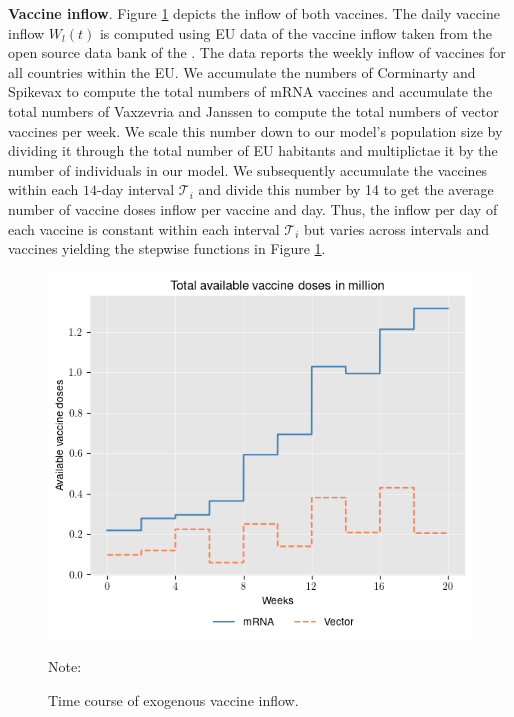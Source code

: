 \textbf{Vaccine inflow}. Figure \ref{fig:available_vaccine} depicts the inflow of both vaccines. The daily vaccine inflow $W_l(t)$ is computed using EU data of the vaccine inflow taken from the open source data bank of the \cite{ECDC.2021}. The data reports the weekly inflow of vaccines for all countries within the EU. We accumulate the numbers of Corminarty and Spikevax to compute the total numbers of mRNA vaccines and accumulate the total numbers of Vaxzevria and Janssen to compute the total numbers of vector vaccines per week. We scale this number down to our model's population size by dividing it through the total number of EU habitants and multiplictae it by the number of individuals in our model. We subsequently accumulate the vaccines within each $14$-day interval $\mathcal{T}_i$ and divide this number by 14 to get the average number of vaccine doses inflow per vaccine and day. Thus, the inflow per day of each vaccine is constant within each interval $\mathcal{T}_i$ but varies across intervals and vaccines yielding the stepwise functions in Figure \ref{fig:available_vaccine}. 
\begin{figure}[h!]
\centering
\includegraphics[scale=0.7]{images/available_vaccine.png}\\
\begin{flushleft}
\scriptsize{Note: } 
\end{flushleft}
\caption{Time course of exogenous vaccine inflow.}
\label{fig:available_vaccine}
\end{figure}

